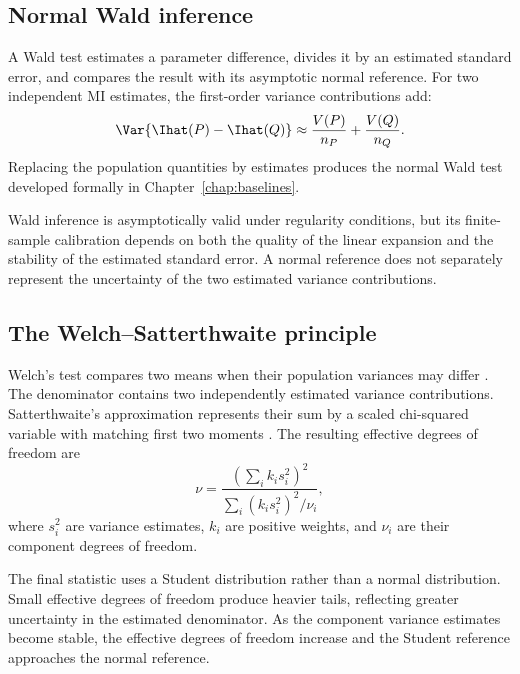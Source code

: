 \subsection{Normal Wald inference}

A Wald test estimates a parameter difference, divides it by an estimated
standard error, and compares the result with its asymptotic normal reference.
For two independent MI estimates, the first-order variance contributions add:
\begin{equation}
  \Var\{\Ihat(P)-\Ihat(Q)\}
  \approx
  \frac{V(P)}{n_P}+
  \frac{V(Q)}{n_Q}.
  \label{eq:wald-variance-background}
\end{equation}
Replacing the population quantities by estimates produces the normal Wald
test developed formally in Chapter~\ref{chap:baselines}.

Wald inference is asymptotically valid under regularity conditions, but its
finite-sample calibration depends on both the quality of the linear expansion
and the stability of the estimated standard error. A normal reference does not
separately represent the uncertainty of the two estimated variance
contributions.

\subsection{The Welch--Satterthwaite principle}

Welch's test compares two means when their population variances may differ
\citep{welch1947}. The denominator contains two independently estimated
variance contributions. Satterthwaite's approximation represents their sum by
a scaled chi-squared variable with matching first two moments
\citep{satterthwaite1946}. The resulting effective degrees of freedom are
\begin{equation}
  \nu
  =
  \frac{\left(\sum_i k_i s_i^2\right)^2}
       {\sum_i (k_i s_i^2)^2/\nu_i},
  \label{eq:general-ws-background}
\end{equation}
where \(s_i^2\) are variance estimates, \(k_i\) are positive weights, and
\(\nu_i\) are their component degrees of freedom.

The final statistic uses a Student distribution rather than a normal
distribution. Small effective degrees of freedom produce heavier tails,
reflecting greater uncertainty in the estimated denominator. As the component
variance estimates become stable, the effective degrees of freedom increase
and the Student reference approaches the normal reference.

